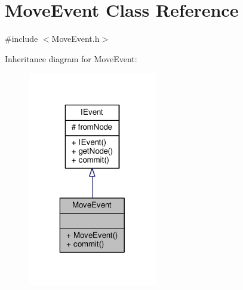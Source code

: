\hypertarget{class_move_event}{\section{Move\-Event Class Reference}
\label{class_move_event}
}


{\ttfamily \#include $<$Move\-Event.\-h$>$}



Inheritance diagram for Move\-Event\-:
\nopagebreak
\begin{figure}[H]
\begin{center}
\leavevmode
\includegraphics[width=160pt]{class_move_event__inherit__graph}
\end{center}
\end{figure}


